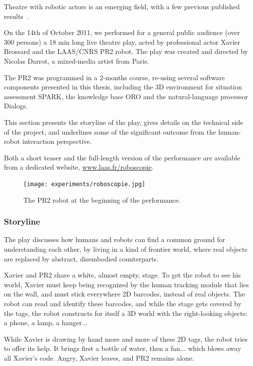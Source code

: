 Theatre with robotic actors is an emerging field, with a few previous published
results~\cite{Breazeal2003, Lin2009, Mavridis2009}.

On the 14th of October 2011, we performed for a general public audience (over
300 persons) a 18 min long live theatre play, acted by professional actor
Xavier Brossard and the LAAS/CNRS PR2 robot. The play was created and directed
by Nicolas Darrot, a mixed-media artist from Paris.

The PR2 was programmed in a 2-months course, re-using several software
components presented in this thesis, including the 3D environment for situation
assessment SPARK, the knowledge base ORO and the natural-language
processor {\sc Dialogs}.

This section presents the storyline of the play, gives details on the technical
side of the project, and underlines some of the significant outcome from the
human-robot interaction perspective.

Both a short teaser and the full-length version of the performance are
available from a dedicated website, \url{www.laas.fr/roboscopie}.

\begin{figure}
    \centering
    \texttt{[image: experiments/roboscopie.jpg]}
    \caption{The PR2 robot at the beginning of the performance.}
    \label{fig|pr2-opens-curtains}
\end{figure}


\subsubsection{Storyline}

The play discusses how humans and robots can find a common ground for understanding
each other, by living in a kind of frontier world, where real objects are replaced 
by abstract, disembodied counterparts.

Xavier and PR2 share a white, almost empty, stage. To get the robot to see his
world, Xavier must keep being recognized by the human tracking module that lies
on the wall, and must stick everywhere 2D barcodes, instead of real
objects. The robot can read and identify these barcodes, and while the stage
gets covered by the tags, the robot constructs for itself a 3D world with the
right-looking objects: a phone, a lamp, a hanger...

While Xavier is drawing by hand more and more of these 2D tags, the robot tries
to offer its help. It brings first a bottle of water, then a fan... which blows
away all Xavier's code. Angry, Xavier leaves, and PR2 remains alone.

